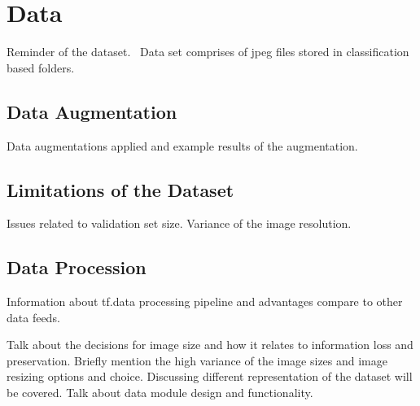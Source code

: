 \chapter{Data} \label{chap:data}
Reminder of the dataset.~\cite{openi} 
Data set comprises of jpeg files stored in classification based folders.

\section{Data Augmentation}
Data augmentations applied and example results of the augmentation.

\section{Limitations of the Dataset}
Issues related to validation set size. Variance of the image resolution.

\section{Data Procession}
Information about tf.data processing pipeline and advantages compare to other data feeds.

Talk about the decisions for image size and how it relates to information loss and preservation. Briefly mention the high variance of the image sizes and image resizing options and choice.
Discussing different representation of the dataset will be covered.
Talk about data module design and functionality.
\clearpage